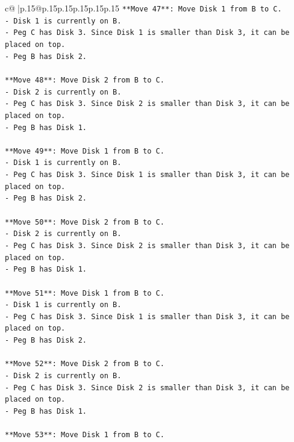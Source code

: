 \documentclass{article}
\begin{document}
{\begin{supertabular}{c@{$\;$}|p{.15\linewidth}@{}p{.15\linewidth}p{.15\linewidth}p{.15\linewidth}p{.15\linewidth}p{.15\linewidth}}
{{{\texttt{**Move 47**: Move Disk 1 from B to C.} \\
\texttt{{-} Disk 1 is currently on B.} \\
\texttt{{-} Peg C has Disk 3. Since Disk 1 is smaller than Disk 3, it can be placed on top.} \\
\texttt{{-} Peg B has Disk 2.} \\
\\ 
\texttt{**Move 48**: Move Disk 2 from B to C.} \\
\texttt{{-} Disk 2 is currently on B.} \\
\texttt{{-} Peg C has Disk 3. Since Disk 2 is smaller than Disk 3, it can be placed on top.} \\
\texttt{{-} Peg B has Disk 1.} \\
\\ 
\texttt{**Move 49**: Move Disk 1 from B to C.} \\
\texttt{{-} Disk 1 is currently on B.} \\
\texttt{{-} Peg C has Disk 3. Since Disk 1 is smaller than Disk 3, it can be placed on top.} \\
\texttt{{-} Peg B has Disk 2.} \\
\\ 
\texttt{**Move 50**: Move Disk 2 from B to C.} \\
\texttt{{-} Disk 2 is currently on B.} \\
\texttt{{-} Peg C has Disk 3. Since Disk 2 is smaller than Disk 3, it can be placed on top.} \\
\texttt{{-} Peg B has Disk 1.} \\
\\ 
\texttt{**Move 51**: Move Disk 1 from B to C.} \\
\texttt{{-} Disk 1 is currently on B.} \\
\texttt{{-} Peg C has Disk 3. Since Disk 1 is smaller than Disk 3, it can be placed on top.} \\
\texttt{{-} Peg B has Disk 2.} \\
\\ 
\texttt{**Move 52**: Move Disk 2 from B to C.} \\
\texttt{{-} Disk 2 is currently on B.} \\
\texttt{{-} Peg C has Disk 3. Since Disk 2 is smaller than Disk 3, it can be placed on top.} \\
\texttt{{-} Peg B has Disk 1.} \\
\\ 
\texttt{**Move 53**: Move Disk 1 from B to C.} \\
}}}
\end{supertabular}}
\end{document}
